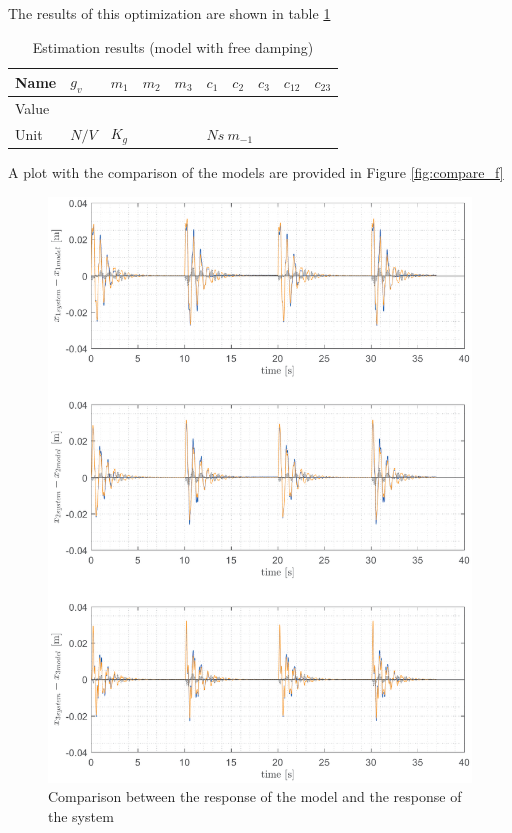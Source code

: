 \documentclass[twosided,a4paper]{article}           %
\begin{document}
The results of this optimization are shown in table \ref{tab:est_full_results}
\begin{table}[H]
	\centering
	\label{tab:est_full_results}
	\begin{tabular}{|l|l|l|l|l|l|l|l|l|l|}
		\hline
		Name & $g_v$ &  $m_1$ & $m_2$ & $m_3$  &  $c_1$ & $c_2$ & $c_3$  & $c_{12}$ & $c_{23}$ \\
		\hline
		Value &  &  &  &  &  &  &  &  &  \\ 
		\hline
		Unit & $N/V$ &  \multicolumn{3}{l|}{$K_g$}  &  \multicolumn{5}{l|}{$Ns \ m_{-1}$} \\
		\hline
\end{tabular}
\caption{Estimation results (model with free damping)}
\end{table}
A plot with the comparison of the models are provided in Figure \ref{fig:compare_f}
\begin{figure}[H]
	\centering
		\caption{Comparison between the response of the model and the response of the system}
	\includegraphics[width=\linewidth]{img/compare_3}

	\label{fig:comparef}
\end{figure}
\end{document}
